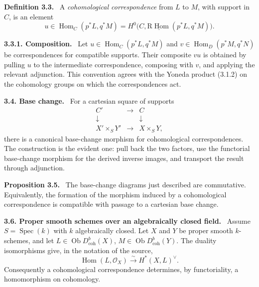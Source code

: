 \documentclass[12pt]{article}
\newcommand{\Spec}{\operatorname{Spec}}
\newcommand{\Hom}{\operatorname{Hom}}
\newcommand{\ob}{\operatorname{Ob}}
\newcommand{\R}{\mathrm R}
\newcommand{\cO}{\mathcal O}
\newenvironment{statement}[1]{\par\medskip\noindent\textbf{#1.}\ }{\par\medskip}
\begin{document}
\begin{statement}{Definition 3.3}
A \emph{cohomological correspondence} from $L$ to $M$, with support in $C$, is an element
\[
   u\in \Hom_C(p^*L,q^*M)
       =H^0\bigl(C,\underline{\R\Hom}(p^*L,q^*M)\bigr).
\]
\end{statement}

\begin{statement}{3.3.1. Composition}
Let $u\in \Hom_C(p^*L,q^*M)$ and $v\in\Hom_D(p^*M,q^*N)$ be correspondences for compatible supports. Their composite $vu$ is obtained by pulling $u$ to the intermediate correspondence, composing with $v$, and applying the relevant adjunction. This convention agrees with the Yoneda product (3.1.2) on the cohomology groups on which the correspondences act.
\end{statement}

\begin{statement}{3.4. Base change}
For a cartesian square of supports
\[
\begin{array}{ccc}
C' & \longrightarrow & C \\
\downarrow & & \downarrow \\
X'\times_S Y' & \longrightarrow & X\times_S Y,
\end{array}
\]
there is a canonical base-change morphism for cohomological correspondences. The construction is the evident one: pull back the two factors, use the functorial base-change morphism for the derived inverse images, and transport the result through adjunction.
\end{statement}

\begin{statement}{Proposition 3.5}
The base-change diagrams just described are commutative. Equivalently, the formation of the morphism induced by a cohomological correspondence is compatible with passage to a cartesian base change.
\end{statement}

\begin{statement}{3.6. Proper smooth schemes over an algebraically closed field}
Assume $S=\Spec(k)$ with $k$ algebraically closed. Let $X$ and $Y$ be proper smooth $k$-schemes, and let
$L\in\ob D^b_{\mathrm{coh}}(X)$, $M\in\ob D^b_{\mathrm{coh}}(Y)$. The duality isomorphisms give, in the notation of the source,
\begin{equation}
   \Hom(L,\cO_X)\xrightarrow{\sim} H^*(X,L)^{\vee}.
   \tag{3.6.1}
\end{equation}
Consequently a cohomological correspondence determines, by functoriality, a homomorphism on cohomology.
\end{statement}
\end{document}
